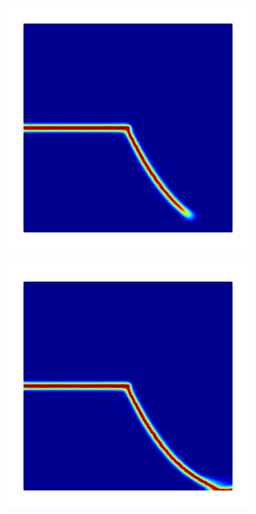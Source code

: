 \begin{figure}[htb!]
\begin{subfigure}[b]{0.21\textwidth}
    \end{subfigure}
    \begin{subfigure}[b]{0.21\textwidth}
        \centering
        \includegraphics[width=\textwidth,scale=0.5]{past/figures/mode2_intact_plate_odd_intermediate.png}
    \end{subfigure}
    \begin{subfigure}[b]{0.21\textwidth}
        \centering
        \includegraphics[width=\textwidth,scale=0.5]{past/figures/mode2_intact_plate_odd_final.png}

\end{subfigure}
\end{figure}
